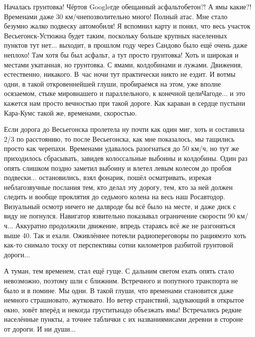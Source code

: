 Началась грунтовка! Чёртов Google\mdash где обещанный асфальтобетон?! А ямы какие?! Временами даже 30 км/ч\mdash непозволительно много! Полный атас. Мне стало безумно жалко подвеску автомобиля! Я вспомнил карту и понял, что весь участок Весьегонск-Устюжна будет таким, поскольку больше крупных населенных пунктов тут нет$\ldots$ выходит, в прошлом году через Сандово было ещё очень даже неплохо! Там хотя бы был асфальт, а тут просто грунтовка! Хоть и широкая и местами укатанная, но грунтовка. С ямами, колдобинами и лужами. Движения, естественно, никакого. В~час ночи тут практически никто не ездит. И вот\mdash мы одни, в такой откровеннейшей глуши, пробираемся на этом, уже вполне осязаемом, стыке миров\mdash нашего и параллельного, к конечной цели\mdash Чагоде$\ldots$ и это кажется нам просто вечностью при такой дороге. Как караван в сердце пустыни Кара-Кум\mdash с такой же, временами, скоростью.

Если дорога до Весьегонска пролетела ну почти как один миг, хоть и составила 2/3 по расстоянию, то после Весьегонска, как мне показалось, мы тащились просто как черепахи. Временами удавалось разогнаться до 50 км/ч, но тут же приходилось сбрасывать, завидев колоссальные выбоины и колдобины. Один раз опять слишком поздно заметил выбоину и влетел левым колесом до пробоя подвески$\ldots$ остановились, взял фонарик, пошёл осматривать, изрекая неблагозвучные послания тем, кто делал эту дорогу, тем, кто за ней должен следить и вообще проклятия до седьмого колена на весь наш Росавтодор. Визуальный осмотр ничего не дал\mdash вроде бы всё было на месте, и даже диск с виду не погнулся. Навигатор язвительно показывал ограничение скорости 90 км/ч$\ldots$ Аккуратно продолжили движение, впредь стараясь всё же не разгоняться выше 40. Так и ехали. Оживлённее потекли радиопереговоры по рациям\mdash это хоть как-то снимало тоску от перспективы сотни километров разбитой грунтовой дороги$\ldots$

А туман, тем временем, стал ещё гуще. С дальним светом ехать опять стало невозможно, поэтому шли с ближним. Встречного и попутного транспорта не было и в помине. Мы одни. В такой глуши, что временами становится даже немного страшновато, жутковато. Но ветер странствий, задувающий в открытое окно, зовёт вперёд и некогда грустить\mdash надо объезжать ямы! Встречались редкие населённые пункты, а точнее таблички с их названиями\mdash сами деревни в стороне от дороги. И ни души$\ldots$

